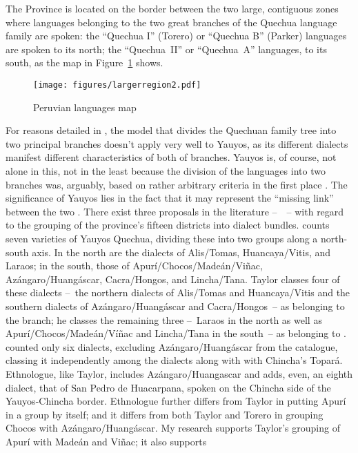 The Province is located on the border between the two large, contiguous zones where languages belonging to the two great branches of the Quechua language family are spoken: the “Quechua I” (Torero) or “Quechua B” (Parker) languages are spoken to its north; the “Quechua~II” or “Quechua~A” languages, to its south, as the map in Figure~\ref{Figcomp} shows.

\begin{figure}

\texttt{[image: figures/largerregion2.pdf]}

\caption{Peruvian languages map}\label{Figcomp} 

\end{figure}

For reasons detailed in , the model that divides the Quechuan family tree into two principal branches doesn’t apply very well to Yauyos, as its different dialects manifest different characteristics of both of branches. Yauyos is, of course, not alone in this, not in the least because the division of the languages into two branches was, arguably, based on rather arbitrary criteria in the first place \citep[See in particular][]{Landerman91}. The significance of Yauyos lies in the fact that it may represent the “missing link” between the two \citep[See in particular][]{Heggarty07}. There exist three proposals in the literature --~\citet{Taylor00,Torero74,ethnologue}~-- with regard to the grouping of the province’s fifteen districts into dialect bundles. \citet[105]{Taylor00} counts seven varieties of Yauyos Quechua, dividing these into two groups along a north-south axis. In the north are the dialects of Alis/Tomas, Huancaya/Vitis, and Laraos; in the south, those of Apurí/Chocos/Madeán/Viñac, Azángaro/Huangáscar, Cacra/Hongos, and Lincha/Tana. Taylor classes four of these dialects --~the northern dialects of Alis/Tomas and Huancaya/Vitis and the southern dialects of Azángaro/Huangáscar and Cacra/Hongos~-- as belonging to the \QI{} branch; he classes the remaining three --~Laraos in the north as well as Apurí/Cho\-cos/Madeán/Víñac and Lincha/Tana in the south~-- as belonging to \QII. \citet{Torero74} counted only six dialects, excluding Azángaro/Huangáscar from the catalogue, classing it independently among the \QI{} dialects along with with Chincha’s Topará. Ethnologue, like Taylor, includes Azángaro/Huangascar and adds, even, an eighth dialect, that of San Pedro de Huacarpana, spoken on the Chincha side of the Yauyos-Chincha border. Ethnologue further differs from Taylor in putting Apurí in a group by itself; and it differs from both Taylor and Torero in grouping Chocos with Azángaro/Huangáscar. My research supports Taylor’s grouping of Apurí with Madeán and Viñac; it also supports 